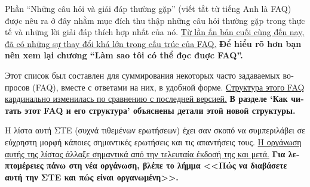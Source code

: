 \documentclass[12pt]{article}
\begin{document}
\begin{CJK}{UTF8}{}
\begin{otherlanguage}{vietnamese}
  Phần ``Những câu hỏi và giải đáp thường gặp'' (viết tắt từ tiếng Anh
  là FAQ) được nêu ra ở đây nhằm mục đích thu thập những câu hỏi
  thường gặp trong thực tế và những lời giải đáp thích hợp nhất của
  nó.  \uline{Từ lần ấn bản cuối cùng đến nay, đã có những sự thay đổi
    khá lớn trong cấu trúc của FAQ.}  \textbf{Để hiểu rõ hơn bạn nên
    xem lại chương ``Làm sao tôi có thể đọc đuợc FAQ''.}
\end{otherlanguage}

\begin{otherlanguage}{russian}
  Этот список был составлен для суммирования некоторых часто
  задаваемых вопросов (FAQ), вместе с ответами на них, в удобной
  форме.  \uline{Структура этого FAQ кардинально изменилась по
    сравнению с послед\-ней версией.}  \textbf{В разделе `Как читать
    этот FAQ и его структура' объяснены детали этой новой структуры.}
\end{otherlanguage}

\begin{otherlanguage}{greek}
  Η λίστα αυτή ΣΤΕ (συχνά τιθεμένων ερωτήσεων) έχει σαν σκοπό να
  συμπεριλάβει σε εύχρηστη μορφή κάποιες σημαντικές ερωτήσεις και τις
  απαντήσεις τους.  \uline{Η οργάνωση αυτής της λίστας άλλαξε
    σημαντικά από την τελευταία έκδοσή της και μετά.}  \textbf{Για
    λεπτομέρειες πάνω στη νέα οργάνωση, βλέπε το λήμμα <<Πώς να
    διαβάσετε αυτή την ΣΤΕ και πώς είναι οργανωμένη>>.}
\end{otherlanguage}

\end{CJK}
\end{document}
